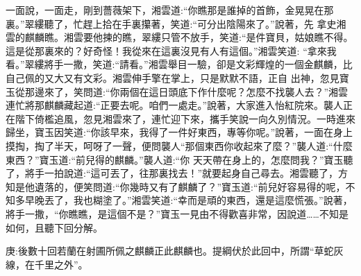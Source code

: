 \begin{parag}
    一面說，一面走，剛到薔薇架下，湘雲道:“你瞧那是誰掉的首飾，金晃晃在那裏。”翠縷聽了，忙趕上拾在手裏攥著，笑道:“可分出陰陽來了。”說著，先 拿史湘雲的麒麟瞧。湘雲要他揀的瞧，翠縷只管不放手，笑道:“是件寶貝，姑娘瞧不得。這是從那裏來的？好奇怪！我從來在這裏沒見有人有這個。”湘雲笑道: “拿來我看。”翠縷將手一撒，笑道:“請看。”湘雲舉目一驗，卻是文彩輝煌的一個金麒麟，比自己佩的又大又有文彩。湘雲伸手擎在掌上，只是默默不語，正自 出神，忽見寶玉從那邊來了，笑問道:“你兩個在這日頭底下作什麼呢？怎麼不找襲人去？”湘雲連忙將那麒麟藏起道:“正要去呢。咱們一處走。”說著，大家進入怡紅院來。襲人正在階下倚檻追風，忽見湘雲來了，連忙迎下來，攜手笑說一向久別情況。一時進來歸坐，寶玉因笑道:“你該早來，我得了一件好東西，專等你呢。”說著，一面在身上摸掏，掏了半天，呵呀了一聲，便問襲人“那個東西你收起來了麼？”襲人道:“什麼東西？”寶玉道:“前兒得的麒麟。”襲人道:“你 天天帶在身上的，怎麼問我？”寶玉聽了，將手一拍說道:“這可丟了，往那裏找去！”就要起身自己尋去。湘雲聽了，方知是他遺落的，便笑問道:“你幾時又有了麒麟了？”寶玉道:“前兒好容易得的呢，不知多早晚丟了，我也糊塗了。”湘雲笑道:“幸而是頑的東西，還是這麼慌張。”說著，將手一撒，“你瞧瞧，是這個不是？”寶玉一見由不得歡喜非常，因說道……不知是如何，且聽下回分解。
\end{parag}


\begin{parag}
    \begin{note}庚:後數十回若蘭在射圃所佩之麒麟正此麒麟也。提綱伏於此回中，所謂“草蛇灰線，在千里之外”。\end{note}
\end{parag}

